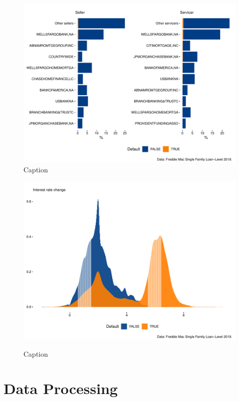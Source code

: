 \begin{figure}
    \centering
    \includegraphics[width = \textwidth]{Figures/pw_6.pdf}
    \caption{Caption}
    \label{fig:my_label}
\end{figure}

\begin{figure}
    \caption{Caption}
    \centering
    \includegraphics[width = \textwidth]{Figures/pw_7.pdf}
    \label{fig:my_label}
\end{figure}

        
\section{Data Processing}
    

